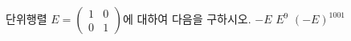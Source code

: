 \hspace*{2mm}\begin{minipage}[t]{\dimexpr\linewidth-2mm\relax}\vspace{0pt}
단위행렬 $E=\begin{pmatrix} 1 & 0 \\ 0 & 1 \end{pmatrix}$에 대하여 다음을 구하시오.
 $-E$
 $E^9$
 $(-E)^{1001}$\end{minipage}
